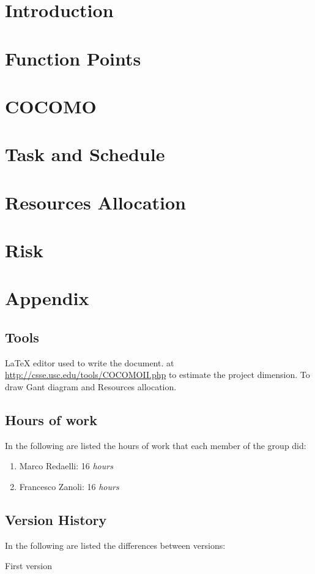 \documentclass{../Common/Structure/doc_pdf}
\begin{document}
	\titleToc{}
  \chapter{Introduction}
  
  \newpage

  \chapter{Function Points}
  

	\chapter{COCOMO}
	
  \newpage

	\chapter{Task and Schedule}
	

	\chapter{Resources Allocation}
	

	\chapter{Risk}
	

  \appendix
  \chapter{Appendix}

  \section{Tools}
  \begin{itemize}
  	 \LaTeX{} editor used to write the document.
		 at \url{http://csse.usc.edu/tools/COCOMOII.php} to estimate the project dimension.
  	 To draw Gant diagram and Resources allocation.\end{itemize}
  \section{Hours of work}
  In the following are listed the hours of work that each member of the group did:
  \begin{enumerate}
  	\item Marco Redaelli: 16 \emph{hours}
  	\item Francesco Zanoli: 16 \emph{hours}
  \end{enumerate}
  \section{Version History}
  In the following are listed the differences between versions:
  \begin{enumerate}
  	 First version
  \end{enumerate}

  
\end{document}
